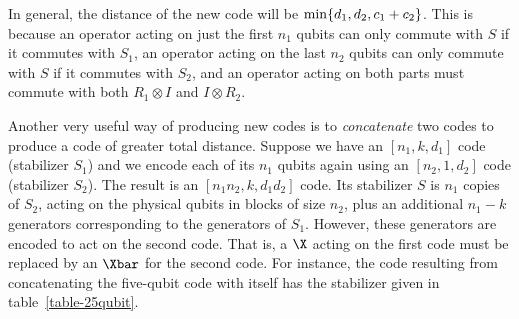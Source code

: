 In general, the distance of the new code will be ${\rm min}\{d_1, d_2, c_1
+ c_2 \}$.  This is because an operator acting on just the first $n_1$ qubits
can only commute with $S$ if it commutes with $S_1$, an operator acting
on the last $n_2$ qubits can only commute with $S$ if it commutes with
$S_2$, and an operator acting on both parts must commute with both $R_1
\otimes I$ and $I \otimes R_2$.

Another very useful way of producing new codes is to {\em concatenate}
two codes to produce a code of greater total distance.  Suppose we have an
$[n_1, k, d_1]$ code (stabilizer $S_1$) and we encode each of its $n_1$
qubits again using an $[n_2, 1, d_2]$ code (stabilizer $S_2$).  The result is
an $[n_1 n_2, k, d_1 d_2]$ code.  Its stabilizer $S$ is $n_1$ copies of $S_2$,
acting on the physical qubits in blocks of size $n_2$, plus an additional
$n_1 - k$ generators corresponding to the generators of $S_1$.  However, these
generators are encoded to act on the second code.  That is, a $\X$ acting
on the first code must be replaced by an $\Xbar$ for the second code.  For
instance, the code resulting from concatenating the five-qubit code with itself
has the stabilizer given in table~\ref{table-25qubit}.
